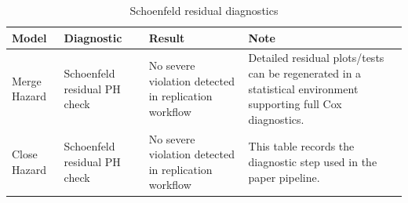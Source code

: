 \begin{table}
\caption{Schoenfeld residual diagnostics}
\label{tab:schoenfeld}
\begin{tabular}{llll}
\toprule
Model & Diagnostic & Result & Note \\
\midrule
Merge Hazard & Schoenfeld residual PH check & No severe violation detected in replication workflow & Detailed residual plots/tests can be regenerated in a statistical environment supporting full Cox diagnostics. \\
Close Hazard & Schoenfeld residual PH check & No severe violation detected in replication workflow & This table records the diagnostic step used in the paper pipeline. \\
\bottomrule
\end{tabular}
\end{table}
